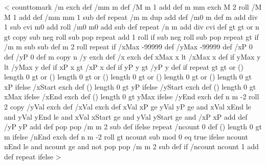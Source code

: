 <{%
  counttomark /m exch def
  \ifPsk@xyValues\else %
    /mm m def
    /M m 1 add def
    m { mm exch M 2 roll /M M 1 add def /mm mm 1 sub def } repeat
    /m m dup add def
  \fi
  \ifPst@ChangeOrder
    /m0 m def
    m \psk@plotNoMax{} add div 1 sub cvi {
      m0 \psk@plotNoMax{} add roll /m0 m0 \psk@plotNoMax{} add sub def
    } repeat
  \fi
  /n m \psk@plotNoMax{} add div cvi def
  \psk@plotNoMax{} gt \psk@plotNoTwo{} gt or {%
    n {
      \psk@plotNoTwo{} gt {
        \psk@plotNoMax\space copy
        \psk@plotNoMax\space \psk@plotNoTwo{} sub neg roll %
        \psk@plotNoMax{} sub { pop } repeat %
        \psk@plotNoMax{} add 1 roll } if
      \psk@plotNoMax\space \psk@plotNo{} sub neg roll %
      \psk@plotNoMax{} sub { pop } repeat %
      \psk@plotNoTwo{} gt {
          \psk@plotNoTwoFunc\space } if %
      /m m \psk@plotNoMax{} sub sub def
      m 2 roll
    } repeat
  } if %
  /xMax -99999 def /yMax -99999 def
  /xP 0 def /yP 0 def
  m copy
  n {
    /y exch def /x exch def
    xMax x lt { /xMax x def } if
    yMax y lt {/yMax y def } if
    xP x gt { /xP x def } if
    yP y gt { /yP y def } if
  } repeat
  \psk@xStep{} gt \psk@yStep{} gt or (\psk@xStart) length 0 gt or
  (\psk@yStart) length 0 gt or (\psk@xEnd) length 0 gt or (\psk@yEnd) length 0 gt or {
%
    (\psk@xStart) length 0 gt {\psk@xStart\space }{ xP } ifelse /xStart exch def
    (\psk@yStart) length 0 gt {\psk@yStart\space }{ yP } ifelse /yStart exch def
    (\psk@xEnd) length 0 gt { \psk@xEnd\space }{ xMax } ifelse /xEnd exch def
    (\psk@yEnd) length 0 gt { \psk@yEnd\space }{ yMax } ifelse /yEnd exch def
    n {
      m -2 roll
      2 copy /yVal exch def /xVal exch def
      xVal xP ge
      yVal yP ge and
      xVal xEnd le and
      yVal yEnd le and
      xVal xStart ge and
      yVal yStart ge and {
        /xP xP \psk@xStep\space add def
        /yP yP \psk@yStep\space add def
      }{%
        pop pop
        /m m 2 sub def
      } ifelse
    } repeat
  }{%
    /ncount 0 def
    (\psk@nEnd) length 0 gt { \psk@nEnd\space }{ m } ifelse
    /nEnd exch def
    n {
      m -2 roll
      \psk@nStep{} gt {
        ncount \psk@nStart\space sub \psk@nStep\space mod 0 eq }{ true } ifelse
        ncount nEnd le and
        ncount \psk@nStart\space ge and not {
          pop pop
          /m m 2 sub def
        } if
        /ncount ncount 1 add def
      } repeat
  } ifelse
}>
%


